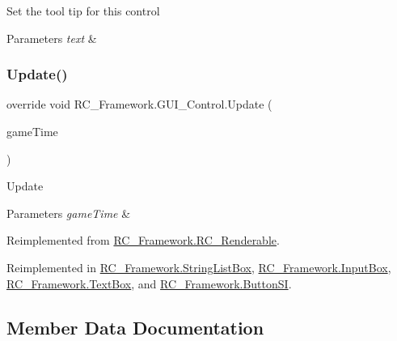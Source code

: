 Set the tool tip for this control 


\begin{DoxyParams}{Parameters}
{\em text} & \\
\hline
\end{DoxyParams}
\mbox{\label{class_r_c___framework_1_1_g_u_i___control_a7aa3b0b6ba141d995ca830ff99ae3003}} 
\subsubsection{\texorpdfstring{Update()}{Update()}}
{\footnotesize\ttfamily override void R\+C\+\_\+\+Framework.\+G\+U\+I\+\_\+\+Control.\+Update (\begin{DoxyParamCaption}\item[{Game\+Time}]{game\+Time }\end{DoxyParamCaption})\hspace{0.3cm}{\ttfamily [virtual]}}



Update 


\begin{DoxyParams}{Parameters}
{\em game\+Time} & \\
\hline
\end{DoxyParams}


Reimplemented from \mbox{\hyperlink{class_r_c___framework_1_1_r_c___renderable_a5745bedc7ba0587aa1e1d8563c357228}{R\+C\+\_\+\+Framework.\+R\+C\+\_\+\+Renderable}}.



Reimplemented in \mbox{\hyperlink{class_r_c___framework_1_1_string_list_box_a8466c2c89cf05f46f4abb281d1517ff5}{R\+C\+\_\+\+Framework.\+String\+List\+Box}}, \mbox{\hyperlink{class_r_c___framework_1_1_input_box_ac91004a57916d0f9f55a40c007cb72ce}{R\+C\+\_\+\+Framework.\+Input\+Box}}, \mbox{\hyperlink{class_r_c___framework_1_1_text_box_ad0faeeb8a2ffc1a9fc593e58a80e8376}{R\+C\+\_\+\+Framework.\+Text\+Box}}, and \mbox{\hyperlink{class_r_c___framework_1_1_button_s_i_a28efd8765e3ec06c727477352d1e5c01}{R\+C\+\_\+\+Framework.\+Button\+SI}}.



\subsection{Member Data Documentation}
\mbox{\label{class_r_c___framework_1_1_g_u_i___control_a38f8a94f8ae576e42dbce0c043ee31fb}} 
